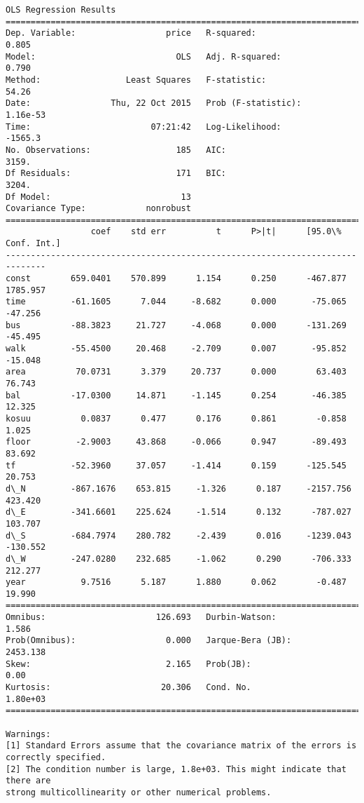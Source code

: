 \documentclass[a4paper,dvipdfmx]{jsarticle}
\begin{document}
    \begin{Verbatim}[commandchars=\\\{\}]
OLS Regression Results                            
==============================================================================
Dep. Variable:                  price   R-squared:                       0.805
Model:                            OLS   Adj. R-squared:                  0.790
Method:                 Least Squares   F-statistic:                     54.26
Date:                Thu, 22 Oct 2015   Prob (F-statistic):           1.16e-53
Time:                        07:21:42   Log-Likelihood:                -1565.3
No. Observations:                 185   AIC:                             3159.
Df Residuals:                     171   BIC:                             3204.
Df Model:                          13                                         
Covariance Type:            nonrobust                                         
==============================================================================
                 coef    std err          t      P>|t|      [95.0\% Conf. Int.]
------------------------------------------------------------------------------
const        659.0401    570.899      1.154      0.250      -467.877  1785.957
time         -61.1605      7.044     -8.682      0.000       -75.065   -47.256
bus          -88.3823     21.727     -4.068      0.000      -131.269   -45.495
walk         -55.4500     20.468     -2.709      0.007       -95.852   -15.048
area          70.0731      3.379     20.737      0.000        63.403    76.743
bal          -17.0300     14.871     -1.145      0.254       -46.385    12.325
kosuu          0.0837      0.477      0.176      0.861        -0.858     1.025
floor         -2.9003     43.868     -0.066      0.947       -89.493    83.692
tf           -52.3960     37.057     -1.414      0.159      -125.545    20.753
d\_N         -867.1676    653.815     -1.326      0.187     -2157.756   423.420
d\_E         -341.6601    225.624     -1.514      0.132      -787.027   103.707
d\_S         -684.7974    280.782     -2.439      0.016     -1239.043  -130.552
d\_W         -247.0280    232.685     -1.062      0.290      -706.333   212.277
year           9.7516      5.187      1.880      0.062        -0.487    19.990
==============================================================================
Omnibus:                      126.693   Durbin-Watson:                   1.586
Prob(Omnibus):                  0.000   Jarque-Bera (JB):             2453.138
Skew:                           2.165   Prob(JB):                         0.00
Kurtosis:                      20.306   Cond. No.                     1.80e+03
==============================================================================

Warnings:
[1] Standard Errors assume that the covariance matrix of the errors is correctly specified.
[2] The condition number is large, 1.8e+03. This might indicate that there are
strong multicollinearity or other numerical problems.
    \end{Verbatim}
\end{document}
